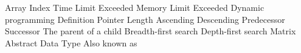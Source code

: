 %
%


 Array 
 Index
 Time Limit Exceeded
 Memory Limit Exceeded
 Dynamic programming 
 Definition
 Pointer 
 Length
 Ascending
 Descending
 Predecessor
 Successor
 The parent of a child
 Breadth-first search
 Depth-first search 
 Matrix
 Abstract Data Type
 Also known as
